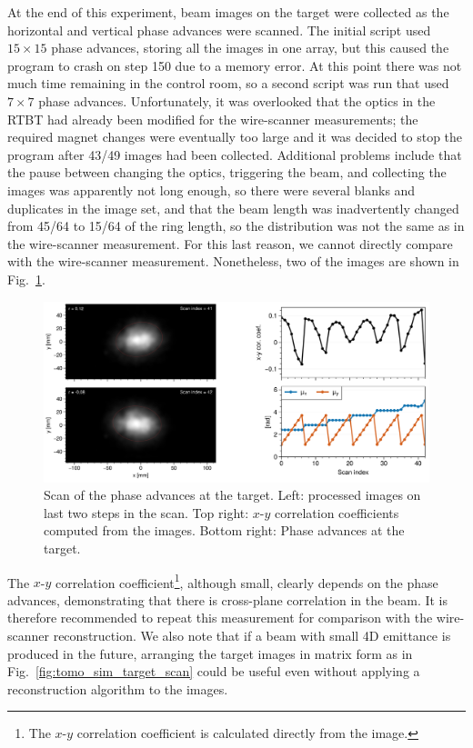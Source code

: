 At the end of this experiment, beam images on the target were collected as the horizontal and vertical phase advances were scanned. The initial script used $15 \times 15$ phase advances, storing all the images in one array, but this caused the program to crash on step 150 due to a memory error. At this point there was not much time remaining in the control room, so a second script was run that used $7 \times 7$ phase advances. Unfortunately, it was overlooked that the optics in the RTBT had already been modified for the wire-scanner measurements; the required magnet changes were eventually too large and it was decided to stop the program after 43/49 images had been collected. Additional problems include that the pause between changing the optics, triggering the beam, and collecting the images was apparently not long enough, so there were several blanks and duplicates in the image set, and that the beam length was inadvertently changed from 45/64 to 15/64 of the ring length, so the distribution was not the same as in the wire-scanner measurement. For this last reason, we cannot directly compare with the wire-scanner measurement. Nonetheless, two of the images are shown in Fig.~\ref{fig:exp3_target_scan}. 
%
\begin{figure}[!p]
    \centering
    \includegraphics[width=\textwidth]{Images/chapter5/exp3/target_scan/target_scan.png}
    \caption{Scan of the phase advances at the target. Left: processed images on last two steps in the scan. Top right: $x$-$y$ correlation coefficients computed from the images. Bottom right: Phase advances at the target.}
    \label{fig:exp3_target_scan}
\end{figure}
%
The $x$-$y$ correlation coefficient\footnote{The $x$-$y$ correlation coefficient is calculated directly from the image.}, although small, clearly depends on the phase advances, demonstrating that there is cross-plane correlation in the beam. It is therefore recommended to repeat this measurement for comparison with the wire-scanner reconstruction. We also note that if a beam with small 4D emittance is produced in the future, arranging the target images in matrix form as in Fig.~\ref{fig:tomo_sim_target_scan} could be useful even without applying a reconstruction algorithm to the images. 

